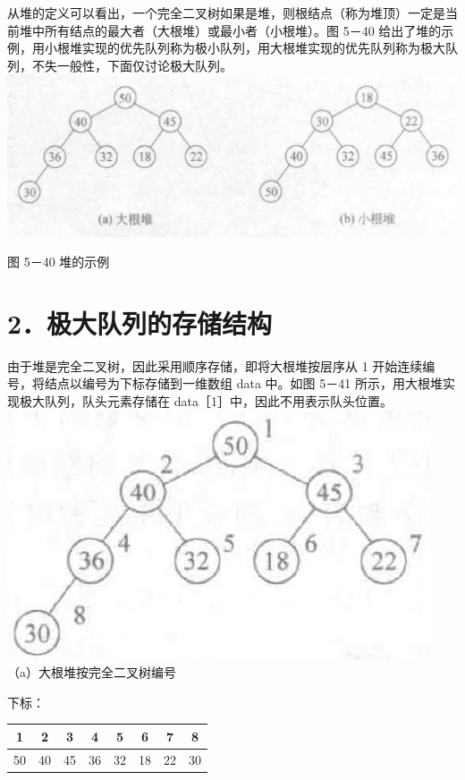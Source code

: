 \documentclass[10pt]{article}
\begin{document}
从堆的定义可以看出，一个完全二叉树如果是堆，则根结点（称为堆顶）一定是当前堆中所有结点的最大者（大根堆）或最小者（小根堆）。图 5－40 给出了堆的示例，用小根堆实现的优先队列称为极小队列，用大根堆实现的优先队列称为极大队列，不失一般性，下面仅讨论极大队列。\\
\includegraphics[max width=\textwidth, center]{2025_06_06_704745ea57b15b2333e5g-175}

图 5－40 堆的示例

\section*{2．极大队列的存储结构}
由于堆是完全二叉树，因此采用顺序存储，即将大根堆按层序从 1 开始连续编号，将结点以编号为下标存储到一维数组 data 中。如图 5－41 所示，用大根堆实现极大队列，队头元素存储在 data［1］中，因此不用表示队头位置。\\
\includegraphics[max width=\textwidth, center]{2025_06_06_704745ea57b15b2333e5g-175(1)}\\
（a）大根堆按完全二叉树编号

下标：

\begin{center}
\begin{tabular}{|c|c|c|c|c|c|c|c|}
\hline
1 & 2 & 3 & 4 & 5 & 6 & 7 & 8 \\
\hline
50 & 40 & 45 & 36 & 32 & 18 & 22 & 30 \\
\hline
\end{tabular}
\end{center}
\end{document}
